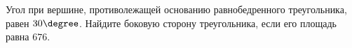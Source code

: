 \begin{ex}
	\begin{condition}
		Угол при вершине, противолежащей основанию равнобедренного треугольника, равен \(30\degree \). Найдите боковую сторону треугольника, если его площадь равна \(676\).
	\end{condition}
\end{ex}